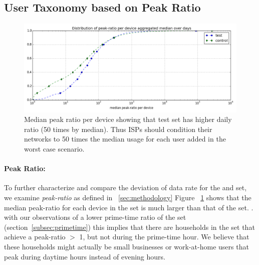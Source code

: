 \subsection{User Taxonomy based on Peak Ratio}
\label{subsec:peakratio}

\begin{figure}[ht!]
\begin{minipage}{0.90\linewidth}
\centering
\includegraphics[width=1\linewidth]{figures/peakratio-CDF-devices-MEDIAN.png}
\caption{Median peak ratio per device showing that test set has higher daily ratio (50 times by median). Thus ISPs should condition their networks to 50 times the median usage for each user added in the worst case scenario.}
\label{fig:CDF-peak-ratio-median}
\end{minipage}
\end{figure}

\paragraph{Peak Ratio: }To further characterize and compare the deviation of data rate for the \control and \test set, we examine \emph{peak-ratio} as defined in ~\ref{sec:methodology} 
Figure ~\ref{fig:CDF-peak-ratio-median} shows that the median peak-ratio for each device in the \test set is much larger than that of the \control set.
.
 with our observations of a lower prime-time ratio of the \test set (section~\ref{subsec:primetime}) this implies that there are households in the \test set that achieve a peak-ratio $>$ 1, but not during the prime-time hour. We believe that these households might actually be small businesses or work-at-home users that peak during daytime hours instead of evening hours.

